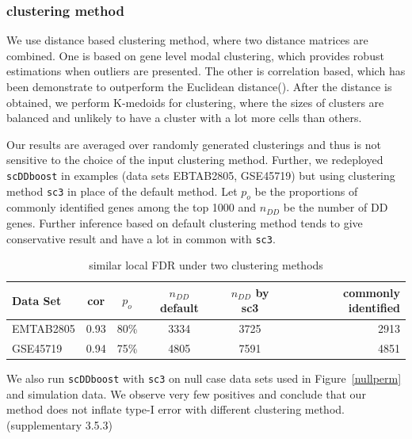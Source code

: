 \documentclass[aoas,preprint]{imsart}
\begin{document}
\subsubsection{clustering method}
We use distance based clustering method, where two distance matrices are combined. 
One is based on gene level modal clustering, which provides robust estimations when outliers are presented. 
The other is correlation based, which has been demonstrate to outperform the Euclidean distance(\cite{Kim:2018}).
After the distance is obtained, we perform K-medoids for clustering, where the sizes of clusters are balanced and unlikely to have a cluster with a lot more cells than others.

Our results are averaged over randomly generated clusterings and thus is not sensitive to the choice of the input clustering method.
Further, we redeployed \texttt{scDDboost} in examples (data sets EBTAB2805, GSE45719) but using clustering method \texttt{sc3} in place of the default method.
Let $p_o$ be the proportions of commonly identified genes among the top 1000 and $n_{DD}$ be the number of DD genes. Further inference based on default clustering method tends to give conservative result and have a lot in common with \texttt{sc3}. 
\begin{table}[htbp]
  \begin{center}
  \begin{tabular}{@{} lccccr @{}} %
      \toprule
      \cmidrule(r){1-5} %
      Data Set   & cor &
      $p_o$ & $n_{DD}$ default & $n_{DD}$ by sc3 & commonly identified\\
      \midrule
      EMTAB2805  & 0.93 & 80\% & 3334 & 3725 & 2913\\          
      GSE45719   & 0.94 & 75\% & 4805 & 7591 & 4851\\
      \bottomrule
  \end{tabular}
  \caption{similar local FDR under two clustering methods}
  \label{tab:dist}
  \end{center}
\end{table}
We also run \texttt{scDDboost} with \texttt{sc3} on null case data sets used in Figure~\ref{nullperm} and simulation data. 
We observe very few positives and conclude that our method does not inflate type-I error with different clustering method.(supplementary 3.5.3)
\end{document}
